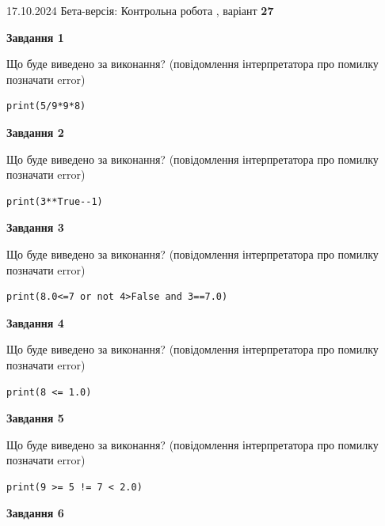 \documentclass[12pt, ukrainian]{article}
\begin{document}
{\Large{17.10.2024 Бета-версія: Контрольна робота , варіант  \No \textbf { 27 }\par}}
{
\begin {large}
{\begin {center}\textbf{Завдання 1}\end {center}}

Що буде виведено за виконання? (повідомлення інтерпретатора про помилку позначати error)\par
\begin{verbatim}
print(5/9*9*8)
\end{verbatim}

{\begin {center}\textbf{Завдання 2}\end {center}}

Що буде виведено за виконання? (повідомлення інтерпретатора про помилку позначати error)\par
\begin{verbatim}
print(3**True--1)
\end{verbatim}

{\begin {center}\textbf{Завдання 3}\end {center}}

Що буде виведено за виконання? (повідомлення інтерпретатора про помилку позначати error)\par
\begin{verbatim}
print(8.0<=7 or not 4>False and 3==7.0)
\end{verbatim}

{\begin {center}\textbf{Завдання 4}\end {center}}

Що буде виведено за виконання? (повідомлення інтерпретатора про помилку позначати error)\par
\begin{verbatim}
print(8 <= 1.0)
\end{verbatim}

{\begin {center}\textbf{Завдання 5}\end {center}}

Що буде виведено за виконання? (повідомлення інтерпретатора про помилку позначати error)\par
\begin{verbatim}
print(9 >= 5 != 7 < 2.0)
\end{verbatim}

{\begin {center}\textbf{Завдання 6}\end {center}}


\end{large}}
\end{document}

